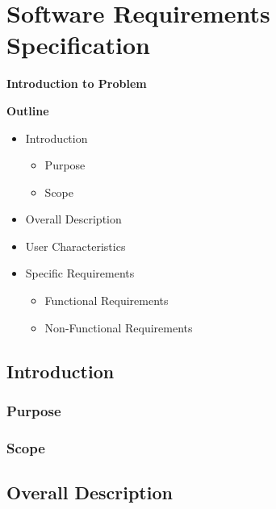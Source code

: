 
\section{Software Requirements Specification}

\vspace{20mm}

\Huge{\textbf{Introduction to Problem}}

\vspace{20mm}


\begin{abstract}
	\blindtext[2]
\end{abstract}

\vspace{20mm}

\large{\textbf{Outline}}

\begin{center}
	\begin{itemize}
		\item Introduction
		\begin{itemize}
            \item Purpose
            \item Scope
        \end{itemize}
		\item Overall Description
		\item User Characteristics
		\item Specific Requirements
        \begin{itemize}
            \item Functional Requirements
            \item Non-Functional Requirements
        \end{itemize}
	\end{itemize}
\end{center}
\pagebreak


\subsection{Introduction}
\blindtext[2]
    \subsubsection{Purpose}
    \blindtext[1]
    \subsubsection{Scope}
    \blindtext[1]

\subsection{Overall Description}
\blindtext[2]

